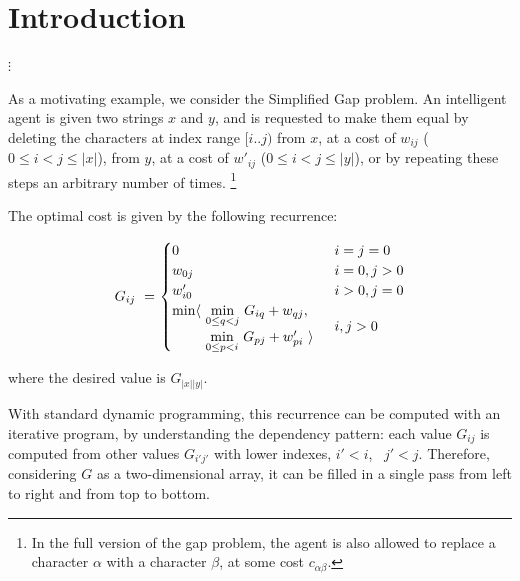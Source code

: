\section{Introduction}

\begin{center}$\vdots$\end{center}

As a motivating example, we consider the Simplified Gap problem.
An intelligent agent is given two strings $x$ and $y$, and is requested
to make them equal by deleting the characters at index range $[i..j)$
from $x$, at a cost of $w_{ij}$ ($0\leq i<j\leq |x|$), from $y$,
at a cost of $w'_{ij}$ ($0\leq i<j\leq |y|$), or by repeating these steps
an arbitrary number of times.
\footnote{In the full version of the gap problem, the agent is also allowed to replace a character $\alpha$ with a character $\beta$, at some cost $c_{\alpha\beta}$.}

The optimal cost is given by the following recurrence:

\begin{equation}
\renewcommand\arraystretch{1.5}
\begin{array}{l@{}l}
	G_{ij} ~=~  &
	\begin{cases}
		0                        & i=j=0 \\
		w_{0j}                   & i=0, j>0 \\
		w'_{i0}                  & i>0, j=0 \\
		\begin{array}{@{}l@{~}l}
		  \min\langle & \underset{0\leq q<j}\min ~ G_{iq} + w_{qj}, \\
		              & \underset{0\leq p<i}\min ~ G_{pj} + w'_{pi}~\rangle
		\end{array}              & i,j>0
	\end{cases}
\end{array}
\label{intro:gap spec}
\end{equation}

\smallskip\noindent
where the desired value is $G_{|x||y|}$.

\medskip
With standard dynamic programming, this recurrence can be computed
with an iterative program, by understanding the dependency pattern:
each value $G_{ij}$ is computed from other values $G_{i'j'}$ with lower
indexes, $i'<i$, ~$j'<j$. Therefore, considering $G$ as a two-dimensional
array, it can be filled in a single pass from left to right and from top
to bottom.

\newcommand\FORLINE[1]{\STATE\algorithmicfor~{#1} \algorithmicdo~}

